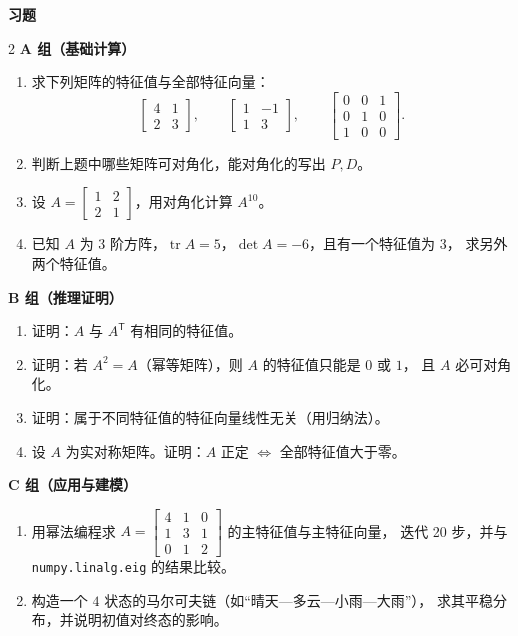 \documentclass[11pt,a4paper,openany]{ctexbook}
\DeclareMathOperator{\tr}{tr}
\newcommand{\exhead}{%
  \par\addvspace{12pt}%
  {\noindent\sffamily\bfseries\Large\color{qing} 习题\par}%
  \vspace{-4pt}\noindent{\color{qing!32}\rule{\linewidth}{0.7pt}}\par\vspace{6pt}}
\begin{document}
\exhead
\begin{multicols}{2}
\small
\textbf{A 组（基础计算）}
\begin{enumerate}[leftmargin=1.6em, itemsep=3pt]
\item 求下列矩阵的特征值与全部特征向量：
      \[ \begin{bmatrix}4&1\\2&3\end{bmatrix},\qquad
         \begin{bmatrix}1&-1\\1&3\end{bmatrix},\qquad
         \begin{bmatrix}0&0&1\\0&1&0\\1&0&0\end{bmatrix}. \]
\item 判断上题中哪些矩阵可对角化，能对角化的写出 $P,D$。
\item 设 $A=\begin{bmatrix}1&2\\2&1\end{bmatrix}$，用对角化计算 $A^{10}$。
\item 已知 $A$ 为 $3$ 阶方阵，$\tr A=5$，$\det A=-6$，且有一个特征值为 $3$，
      求另外两个特征值。
\end{enumerate}
\textbf{B 组（推理证明）}
\begin{enumerate}[leftmargin=1.6em, itemsep=3pt, start=5]
\item 证明：$A$ 与 $A^{\mathsf T}$ 有相同的特征值。
\item 证明：若 $A^2=A$（幂等矩阵），则 $A$ 的特征值只能是 $0$ 或 $1$，
      且 $A$ 必可对角化。
\item 证明：属于不同特征值的特征向量线性无关（用归纳法）。
\item 设 $A$ 为实对称矩阵。证明：$A$ 正定 $\Leftrightarrow$ 全部特征值大于零。
\end{enumerate}
\textbf{C 组（应用与建模）}
\begin{enumerate}[leftmargin=1.6em, itemsep=3pt, start=9]
\item 用幂法编程求
      $A=\begin{bmatrix}4&1&0\\1&3&1\\0&1&2\end{bmatrix}$ 的主特征值与主特征向量，
      迭代 20 步，并与 \texttt{numpy.linalg.eig} 的结果比较。
\item 构造一个 $4$ 状态的马尔可夫链（如“晴天—多云—小雨—大雨”），
      求其平稳分布，并说明初值对终态的影响。
\end{enumerate}
\end{multicols}
\end{document}
